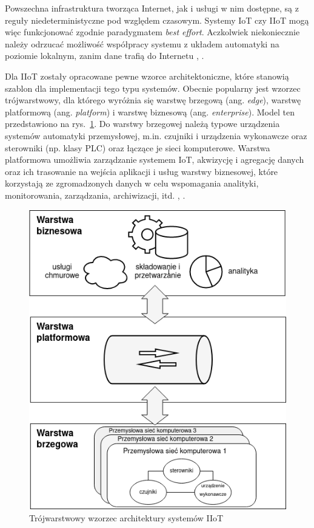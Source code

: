 \documentclass[a4paper, 12pt, twoside]{article}
\begin{document}
Powszechna infrastruktura tworząca Internet, jak i usługi w nim dostępne, są z reguły
niedeterministyczne pod względem czasowym. Systemy IoT czy IIoT mogą więc
funkcjonować zgodnie paradygmatem \emph{best effort}. Aczkolwiek niekoniecznie
należy odrzucać możliwość współpracy systemu z układem automatyki na poziomie lokalnym,
zanim dane trafią do Internetu \cite{iiot-design-and-impl-gateway}, \cite{iiot-rapid-integration-framework}.

Dla IIoT zostały opracowane pewne wzorce architektoniczne,
które stanowią szablon dla implementacji tego typu systemów.
Obecnie popularny jest wzorzec trójwarstwowy, dla którego wyróżnia się
warstwę brzegową (ang. \emph{edge}), warstwę platformową (ang. \emph{platform})
i warstwę biznesową (ang. \emph{enterprise}).
Model ten przedstawiono na rys.~\ref{fig:iiot-arch}. Do warstwy brzegowej należą
typowe urządzenia systemów automatyki przemysłowej, m.in. czujniki i urządzenia wykonawcze oraz
sterowniki (np. klasy PLC) oraz łączące je sieci komputerowe. Warstwa platformowa umożliwia zarządzanie
systemem IoT, akwizycję i agregację danych oraz ich trasowanie na wejścia
aplikacji i usług warstwy biznesowej, które
korzystają ze zgromadzonych danych w celu wspomagania
analityki, monitorowania, zarządzania, archiwizacji, itd. \cite{iiot-challenges-opportunities-directions},  \cite{models-innovative-iot}.

\begin{figure}[h]
      \centering
      \includegraphics[scale=0.6]{iiot_arch.png}
      \caption{Trójwarstwowy wzorzec architektury systemów IIoT}
      \label{fig:iiot-arch}
\end{figure}
\end{document}
